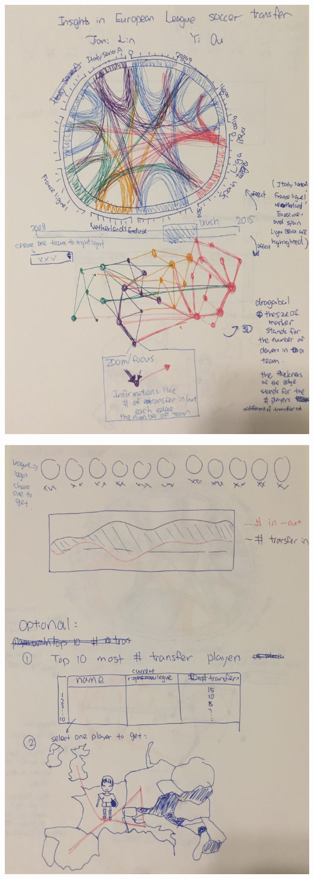 \documentclass[11pt]{article}
\begin{document}
\includegraphics[width=.9\linewidth]{final1.png}

\includegraphics[width=.9\linewidth]{final2.png}
\end{document}
